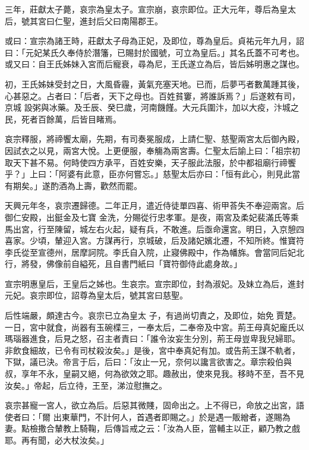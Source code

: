 \begin{pinyinscope}
 三年，莊獻太子薨，哀宗為皇太子。宣宗崩，哀宗即位。正大元年，尊后為皇太后，號其宮曰仁聖，進封后父曰南陽郡王。



 或曰：宣宗為諸王時，莊獻太子母為正妃，及即位，尊為皇后。貞祐元年九月，詔曰：「元妃某氏久奉侍於潛籓，已賜封於國號，可立為皇后。」其名氏蓋不可考也。或又曰：自王氏姊妹入宮而后寵衰，尋為尼，王氏遂立為后，皆后姊明惠之謀也。



 初，王氏姊妹受封之日，大風昏霾，黃氣充塞天地。已而，后夢丐者數萬踵其後，心甚惡之。占者曰：「后者，天下之母也。百姓貧窶，將誰訴焉？」后遂敕有司，京城
 設粥與冰藥。及壬辰、癸巳歲，河南饑饉。大元兵圍汴，加以大疫，汴城之民，死者百餘萬，后皆目睹焉。



 哀宗釋服，將禘饗太廟，先期，有司奏冕服成，上請仁聖、慈聖兩宮太后御內殿，因試衣之以見，兩宮大悅。上更便服，奉觴為兩宮壽。仁聖太后諭上曰：「祖宗初取天下甚不易。何時使四方承平，百姓安樂，天子服此法服，於中都祖廟行禘饗乎？」上曰：「阿婆有此意，臣亦何嘗忘。」慈聖太后亦曰：「恒有此心，則見此當有期矣。」遂酌酒為上壽，歡然而罷。



 天興元年冬，哀宗遷歸德。二年正月，遣近侍徒單四喜、術甲荅失不奉迎兩宮。后御仁安殿，出鋌金及七寶
 金洗，分賜從行忠孝軍。是夜，兩宮及柔妃裴滿氏等乘馬出宮，行至陳留，城左右火起，疑有兵，不敢進。后亟命還宮。明日，入京憩四喜家。少頃，輦迎入宮。方謀再行，京城破，后及諸妃嬪北遷，不知所終。惟寶符李氏從至宣德州，居摩訶院。李氏自入院，止寢佛殿中，作為幡旆。會當同后妃北行，將發，佛像前自縊死，且自書門紙曰「寶符御侍此處身故。」



 宣宗明惠皇后，王皇后之姊也。生哀宗。宣宗即位，封為淑妃。及妹立為后，進封元妃。哀宗即位，詔尊為皇太后，號其宮曰慈聖。



 后性端嚴，頗達古今。哀宗已立為皇太
 子，有過尚切責之，及即位，始免賈楚。一日，宮中就食，尚器有玉碗楪三，一奉太后，二奉帝及中宮。荊王母真妃龐氏以瑪瑙器進食，后見之怒，召主者責曰：「誰令汝妄生分別，荊王母豈卑我兒婦耶。非飲食細故，已令有司杖殺汝矣。」是後，宮中奉真妃有加。或告荊王謀不軌者，下獄，議已決。帝言于后，后曰：「汝止一兄，奈何以讒言欲害之。章宗殺伯與叔，享年不永，皇嗣又絕，何為欲效之耶。趣赦出，使來見我。移時不至，吾不見汝矣。」帝起，后立待，王至，涕泣慰撫之。



 哀宗甚寵一宮人，欲立為后。后惡其微賤，固命出之。上不得已，命放之出宮，語使者曰：「爾
 出東華門，不計何人，首遇者即賜之。」於是遇一販繒者，遂賜為妻。點檢撒合輦教上騎鞠，后傳旨戒之云：「汝為人臣，當輔主以正，顧乃教之戲耶。再有聞，必大杖汝矣。」




\end{pinyinscope}
